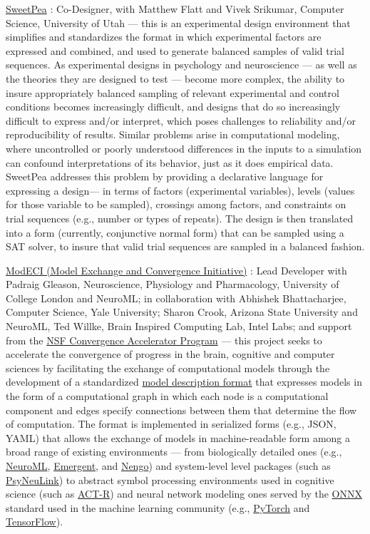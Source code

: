 \documentclass[10 pt]{article}
\begin{document}
\href{https://sites.google.com/view/sweetpea-ai/}{SweetPea} \cite{musslick2022sweetpea}: Co-Designer, with Matthew Flatt and Vivek Srikumar, Computer Science, University of Utah — this is an experimental design environment that simplifies and standardizes the format in which experimental factors are expressed and combined, and used to generate balanced samples of valid trial sequences. As experimental designs in psychology and neuroscience — as well as the theories they are designed to test — become more complex, the ability to insure appropriately balanced sampling of relevant experimental and control conditions becomes increasingly difficult, and designs that do so increasingly difficult to express and/or interpret, which poses challenges to reliability and/or reproducibility of results. Similar problems arise in computational modeling, where uncontrolled or poorly understood differences in the inputs to a simulation can confound interpretations of its behavior, just as it does empirical data. SweetPea addresses this problem by providing a declarative language for expressing a design— in terms of factors (experimental variables), levels (values for those variable to be sampled), crossings among factors, and constraints on trial sequences (e.g., number or types of repeats). The design is then translated into a form (currently, conjunctive normal form) that can be sampled using a SAT solver, to insure that valid trial sequences are sampled in a balanced fashion.
    \smallskip

\href{https://modeci.github.io/Website/}{ModECI (Model Exchange and Convergence Initiative)} \cite{gleeson2023integrating}: Lead Developer with Padraig Gleason, Neuroscience, Physiology and Pharmacology, University of College London and NeuroML; in collaboration with Abhishek Bhattacharjee, Computer Science, Yale University; Sharon Crook, Arizona State University and NeuroML, Ted Willke, Brain Inspired Computing Lab, Intel Labs; and support from the \href{https://www.nsf.gov/od/oia/convergence-accelerator/}{NSF Convergence Accelerator Program} — this project seeks to accelerate the convergence of progress in the brain, cognitive and computer sciences by facilitating the exchange of computational models through the development of a standardized \href{https://github.com/ModECI/MDF}{model description format} that expresses models in the form of a computational graph in which each node is a computational component and edges specify connections between them that determine the flow of computation. The format is implemented in serialized forms (e.g., JSON, YAML) that allows the exchange of models in machine-readable form among a broad range of existing environments — from biologically detailed ones (e.g., \href{https://neuroml.org}{NeuroML}, \href{https://grey.colorado.edu/emergent/index.php/Main_Page}{Emergent}, and \href{https://www.nengo.ai}{Nengo}) and system-level level packages (such as \href{http://psyneulink.org}{PsyNeuLink}) to abstract symbol processing environments used in cognitive science (such as \href{http://act-r.psy.cmu.edu}{ACT-R}) and neural network modeling ones served by the \href{https://onnx.ai}{ONNX} standard used in the machine learning community (e.g., \href{https://pytorch.org}{PyTorch} and \href{https://www.tensorflow.org}{TensorFlow}).
\end{document}
